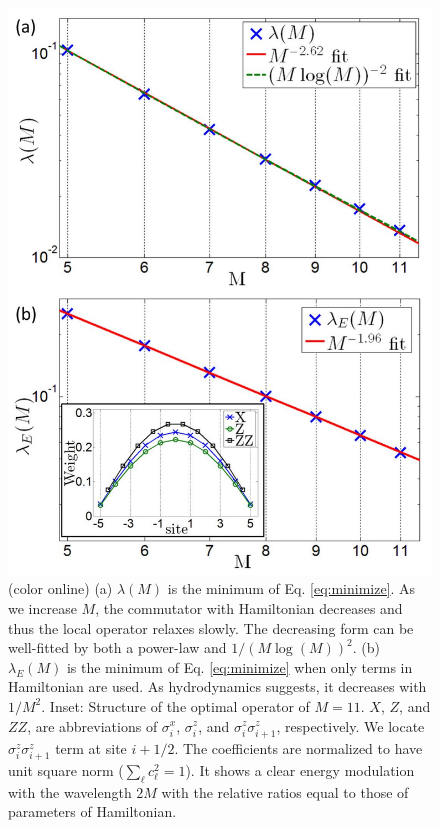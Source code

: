 \documentclass[twocolumn,superscriptaddress, prb]{revtex4-1}
\begin{document}
\begin{figure}
\includegraphics[width=0.95\linewidth]{fig_hamiltonian.pdf}
\centering
\caption{(color online) (a) $\lambda(M)$ is the minimum of Eq. \eqref{eq:minimize}. As we increase $M$, the commutator with Hamiltonian decreases
and thus the local operator relaxes slowly. The decreasing form can be well-fitted by both a power-law and $1/(M\log(M))^2$.
(b)$\lambda_E(M)$ is the minimum of Eq. \eqref{eq:minimize} when only terms in Hamiltonian are used. As hydrodynamics suggests, it decreases with $1/M^2$. Inset: Structure of the optimal operator of $M = 11$. $X$, $Z$, and $ZZ$, are
abbreviations of $\sigma^x_i$, $\sigma^z_i$, and $\sigma^z_i \sigma^z_{i+1}$, respectively.
We locate $\sigma^z_i \sigma^z_{i+1}$ term at site $i+1/2$. The coefficients are normalized to have unit square norm ($\sum_\ell c_\ell^2 = 1$).
It shows a clear energy modulation with the wavelength $2M$ with the relative ratios equal to those of parameters of Hamiltonian. }
\label{fig:hamiltonian}
\end{figure}
\end{document}
